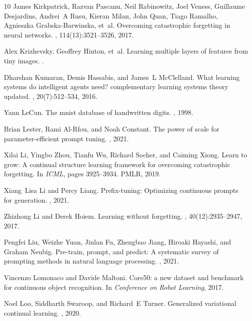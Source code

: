 \documentclass[10pt,twocolumn,letterpaper]{article}
\begin{document}
\begin{thebibliography}{10}
James Kirkpatrick, Razvan Pascanu, Neil Rabinowitz, Joel Veness, Guillaume
  Desjardins, Andrei~A Rusu, Kieran Milan, John Quan, Tiago Ramalho, Agnieszka
  Grabska-Barwinska, et~al.
\newblock Overcoming catastrophic forgetting in neural networks.
, 114(13):3521--3526, 2017.

Alex Krizhevsky, Geoffrey Hinton, et~al.
\newblock Learning multiple layers of features from tiny images.
.

Dharshan Kumaran, Demis Hassabis, and James~L McClelland.
\newblock What learning systems do intelligent agents need? complementary
  learning systems theory updated.
, 20(7):512--534, 2016.

Yann LeCun.
\newblock The mnist database of handwritten digits.
, 1998.

Brian Lester, Rami Al-Rfou, and Noah Constant.
\newblock The power of scale for parameter-efficient prompt tuning.
, 2021.

Xilai Li, Yingbo Zhou, Tianfu Wu, Richard Socher, and Caiming Xiong.
\newblock Learn to grow: A continual structure learning framework for
  overcoming catastrophic forgetting.
\newblock In {\em ICML}, pages 3925--3934. PMLR, 2019.

Xiang~Lisa Li and Percy Liang.
\newblock Prefix-tuning: Optimizing continuous prompts for generation.
, 2021.

Zhizhong Li and Derek Hoiem.
\newblock Learning without forgetting.
, 40(12):2935--2947, 2017.

Pengfei Liu, Weizhe Yuan, Jinlan Fu, Zhengbao Jiang, Hiroaki Hayashi, and
  Graham Neubig.
\newblock Pre-train, prompt, and predict: A systematic survey of prompting
  methods in natural language processing.
, 2021.

Vincenzo Lomonaco and Davide Maltoni.
\newblock Core50: a new dataset and benchmark for continuous object
  recognition.
\newblock In {\em Conference on Robot Learning}, 2017.

Noel Loo, Siddharth Swaroop, and Richard~E Turner.
\newblock Generalized variational continual learning.
, 2020.


\end{thebibliography}
\end{document}
